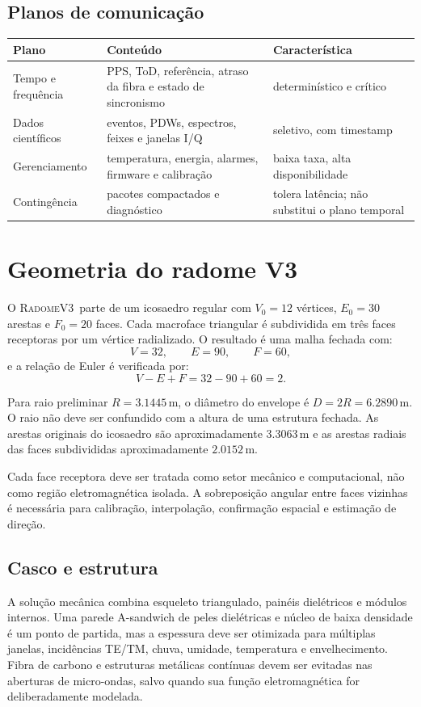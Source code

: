 \documentclass[11pt,a4paper]{report}
\newcommand{\radome}{\textsc{Radome}}
\newcommand{\vthree}{\radome V3}
\newcommand{\SI}[2]{\ensuremath{#1\,\mathrm{#2}}}
\begin{document}
\section{Planos de comunicação}
\begin{longtable}{p{}p{}p{}}
\toprule
\textbf{Plano} & \textbf{Conteúdo} & \textbf{Característica}\\
\midrule
Tempo e frequência & PPS, ToD, referência, atraso da fibra e estado de sincronismo & determinístico e crítico\\
Dados científicos & eventos, PDWs, espectros, feixes e janelas I/Q & seletivo, com timestamp\\
Gerenciamento & temperatura, energia, alarmes, firmware e calibração & baixa taxa, alta disponibilidade\\
Contingência & pacotes compactados e diagnóstico & tolera latência; não substitui o plano temporal\\
\bottomrule
\end{longtable}

\chapter{Geometria do radome V3}

O \vthree\ parte de um icosaedro regular com $V_0=12$ vértices, $E_0=30$ arestas e $F_0=20$ faces. Cada macroface triangular é subdividida em três faces receptoras por um vértice radializado. O resultado é uma malha fechada com:
\[
V=32,\qquad E=90,\qquad F=60,
\]
e a relação de Euler é verificada por:
\[
V-E+F=32-90+60=2.
\]

Para raio preliminar $R=\SI{3.1445}{m}$, o diâmetro do envelope é $D=2R=\SI{6.2890}{m}$. O raio não deve ser confundido com a altura de uma estrutura fechada. As arestas originais do icosaedro são aproximadamente $\SI{3.3063}{m}$ e as arestas radiais das faces subdivididas aproximadamente $\SI{2.0152}{m}$.

Cada face receptora deve ser tratada como setor mecânico e computacional, não como região eletromagnética isolada. A sobreposição angular entre faces vizinhas é necessária para calibração, interpolação, confirmação espacial e estimação de direção.

\section{Casco e estrutura}

A solução mecânica combina esqueleto triangulado, painéis dielétricos e módulos internos. Uma parede A-sandwich de peles dielétricas e núcleo de baixa densidade é um ponto de partida, mas a espessura deve ser otimizada para múltiplas janelas, incidências TE/TM, chuva, umidade, temperatura e envelhecimento. Fibra de carbono e estruturas metálicas contínuas devem ser evitadas nas aberturas de micro-ondas, salvo quando sua função eletromagnética for deliberadamente modelada.
\end{document}
